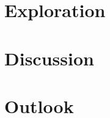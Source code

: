 \documentclass[12pt]{book} %
\begin{document}
\chapter{Exploration}



\chapter{Discussion}



\chapter{Outlook} \label{outlook}





\clearpage{}   %
{} %




\makeatletter\@openrightfalse
\begin{appendices}
%



\end{appendices}
\@openrighttrue\makeatletter


\end{document}
